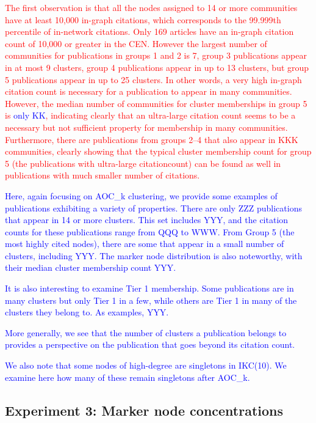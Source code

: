 \documentclass[12pt, oneside]{article}   	%
\begin{document}
\textcolor{red}{
The first observation is that all the nodes assigned to 14 or more communities have at least 10,000 in-graph citations, which corresponds to the 99.999th percentile of in-network citations. Only 169 articles have an in-graph citation count of 10,000 or greater in the CEN. However the largest number of communities for publications in groups 1 and 2 is 7, group 3 publications appear in at most 9 clusters, group 4 publications appear in up to 13 clusters, 
but group 5 publications appear in up to 25 clusters.
In other words, a very high in-graph citation count is necessary  for a publication to appear in many communities. However, the median number of communities for cluster memberships in group 5 is \textcolor{blue}{only KK}, indicating clearly that
 an ultra-large citation count seems to be a necessary but not sufficient property for membership in many communities.
Furthermore, there are publications from groups 2--4 that also appear in KKK communities, clearly showing that the typical cluster membership count for group 5 (the publications with ultra-large citationcount) can be found as well in publications with much smaller number of citations.
}

\textcolor{blue}{
Here, again focusing on AOC\_k clustering, we provide some examples
of publications exhibiting a variety of properties.
There are only ZZZ  publications that appear in 14 or more
clusters.  This set includes YYY, and the citation counts for
these publications range from QQQ to WWW.
From Group 5 (the most highly cited nodes), there are some that
appear in a small number of clusters, 
including YYY.
The marker node distribution is also noteworthy, with their
median cluster membership count YYY.
}

\textcolor{blue}{It is also interesting to examine Tier 1 membership.
Some publications are in many clusters but only Tier 1 in a few,
while others are Tier 1 in many of the clusters they belong to.
As examples, YYY.}

\textcolor{blue}{More generally, we see that the number of
clusters a publication belongs to provides a perspective on the publication
that goes beyond its citation count.}


\textcolor{blue}{
We also note that some nodes of high-degree are singletons in IKC(10).
We examine here how many of these remain singletons after
 AOC\_k.
}

\subsection{Experiment 3: Marker node concentrations}
\end{document}
